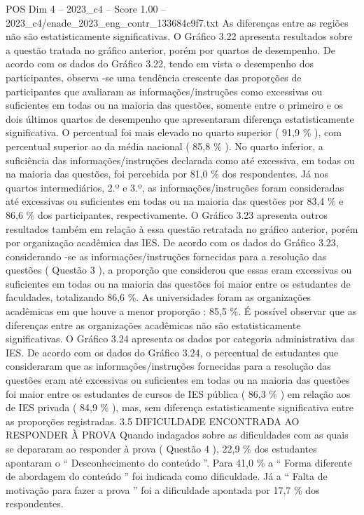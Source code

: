 \begin{textsample}{POS Dim 4 – 2023\_c4 – Score 1.00 – 2023\_c4/enade\_2023\_eng\_contr\_133684c9f7.txt}
As diferenças entre as regiões não são estatisticamente significativas.
O Gráfico 3.22 apresenta resultados sobre a questão tratada no gráfico anterior, porém por quartos de desempenho.
De acordo com os dados do Gráfico 3.22, tendo em vista o desempenho dos participantes, observa -se uma tendência crescente das proporções de participantes que avaliaram as informações/instruções como excessivas ou suficientes em todas ou na maioria das questões, somente entre o primeiro e os dois últimos quartos de desempenho que apresentaram diferença estatisticamente significativa.
O percentual foi mais elevado no quarto superior ( 91,9 \% ), com percentual superior ao da média nacional ( 85,8 \% ).
No quarto inferior, a suficiência das informações/instruções declarada como até excessiva, em todas ou na maioria das questões, foi percebida por 81,0 \% dos respondentes.
Já nos quartos intermediários, 2.º e 3.º, as informações/instruções foram consideradas até excessivas ou suficientes em todas ou na maioria das questões por 83,4 \% e 86,6 \% dos participantes, respectivamente.
O Gráfico 3.23 apresenta outros resultados também em relação à essa questão retratada no gráfico anterior, porém por organização acadêmica das IES.
De acordo com os dados do Gráfico 3.23, considerando -se as informações/instruções fornecidas para a resolução das questões ( Questão 3 ), a proporção que considerou que essas eram excessivas ou suficientes em todas ou na maioria das questões foi maior entre os estudantes de faculdades, totalizando 86,6 \%.
As universidades foram as organizações acadêmicas em que houve a menor proporção : 85,5 \%.
É possível observar que as diferenças entre as organizações acadêmicas não são estatisticamente significativas.
O Gráfico 3.24 apresenta os dados por categoria administrativa das IES.
De acordo com os dados do Gráfico 3.24, o percentual de estudantes que consideraram que as informações/instruções fornecidas para a resolução das questões eram até excessivas ou suficientes em todas ou na maioria das questões foi maior entre os estudantes de cursos de IES pública ( 86,3 \% ) em relação aos de IES privada ( 84,9 \% ), mas, sem diferença estatisticamente significativa entre as proporções registradas. 3.5 DIFICULDADE ENCONTRADA AO RESPONDER À PROVA Quando indagados sobre as dificuldades com as quais se depararam ao responder à prova ( Questão 4 ), 22,9 \% dos estudantes apontaram o “ Desconhecimento do conteúdo ”.
Para 41,0 \% a “ Forma diferente de abordagem do conteúdo ” foi indicada como dificuldade.
Já a “ Falta de motivação para fazer a prova ” foi a dificuldade apontada por 17,7 \% dos respondentes.

\end{textsample}
